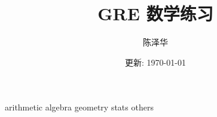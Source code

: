 \documentclass{report}
\title{GRE 数学练习}
\author{陈泽华}
\date{更新: \today}
\begin{document}
  \maketitle
  \tableofcontents

  {arithmetic}
  {algebra}
  {geometry}
  {stats}
  {others}
\end{document}
